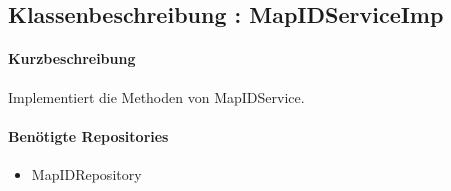 \subsection{Klassenbeschreibung : MapIDServiceImp}%
\paragraph*{Kurzbeschreibung}
Implementiert die Methoden von MapIDService.
\paragraph*{Benötigte Repositories}
\begin{itemize}
    \item MapIDRepository
\end{itemize}
